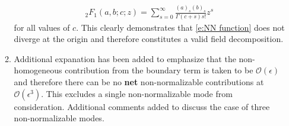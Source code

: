 \documentclass[11pt,letterpaper]{article}
\newcommand{\mc}{\mathcal}
\begin{document}
\begin{enumerate}
\begin{enumerate}
\begin{align}
            {_2}F_1 (a, b; c; z) = \sum_{s = 0}^\infty \frac{(a)_s (b)_s}{\Gamma(c + s) s!} z^s
        \end{align}
        for all values of $c$. This clearly demonstrates that \eqref{e:NN function} does not
        diverge at the origin and therefore constitutes a valid field decomposition.
        \item Additional expanation has been added to emphasize that the non-homogeneous contribution
        from the boundary term is taken to be $\mc O(\epsilon)$ and therefore there can be no {\bf net}
        non-normalizable contributions at $\mc O(\epsilon^3)$. This excludes a single non-normalizable mode
        from consideration. Additional comments added to discuss the case of three non-normalizable modes.
    \end{enumerate}
\end{enumerate}
\end{document}
